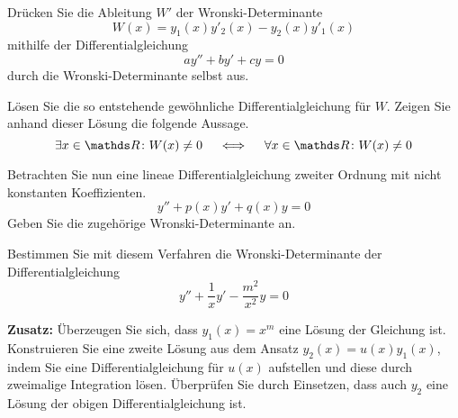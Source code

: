 \begin{atiTask}[
  title = Die Wronski-Determinante
]
  \begin{atiSubtasks}
    \item{
      Drücken Sie die Ableitung $W'$ der Wronski-Determinante
      \[
        W(x) = y_1(x)y'_2(x)-y_2(x)y'_1(x)
      \]
      mithilfe der Differentialgleichung
      \[
        ay'' + by' + cy = 0
      \]
      durch die Wronski-Determinante selbst aus.
    }
    \item{
      Lösen Sie die so entstehende gewöhnliche Differentialgleichung für $W$.
      Zeigen Sie anhand dieser Lösung die folgende Aussage.
      \[
        \exists x\in\setR\colon W(x) \neq 0 \iff \forall x\in\setR\colon W(x) \neq 0
      \]
    }
    \item{
      Betrachten Sie nun eine lineae Differentialgleichung zweiter Ordnung mit nicht konstanten Koeffizienten.
      \[
        y'' + p(x)y' + q(x)y = 0
      \]
      Geben Sie die zugehörige Wronski-Determinante an.
    }
    \item{
      Bestimmen Sie mit diesem Verfahren die Wronski-Determinante der Differentialgleichung
      \[
        y'' + \frac{1}{x}y' - \frac{m^2}{x^2}y = 0
      \]
    }
    \item{
      \textbf{Zusatz:}
      Überzeugen Sie sich, dass $y_1(x)=x^m$ eine Lösung der Gleichung ist.
      Konstruieren Sie eine zweite Lösung aus dem Ansatz $y_2(x) = u(x)y_1(x)$, indem Sie eine Differentialgleichung für $u(x)$ aufstellen und diese durch zweimalige Integration lösen.
      Überprüfen Sie durch Einsetzen, dass auch $y_2$ eine Lösung der obigen Differentialgleichung ist.
    }
  \end{atiSubtasks}
\end{atiTask}